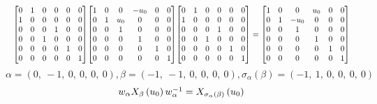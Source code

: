 \documentclass[11pt]{article}
\theoremstyle{definition}
\begin{document}
\[
\scaletoalign{\textwidth}{{\left[\begin{matrix}0 & 1 & 0 & 0 & 0 & 0\\1 & 0 & 0 & 0 & 0 & 0\\0 & 0 & 0 & 1 & 0 & 0\\0 & 0 & 1 & 0 & 0 & 0\\0 & 0 & 0 & 0 & 1 & 0\\0 & 0 & 0 & 0 & 0 & 1\end{matrix}\right]} {\left[\begin{matrix}1 & 0 & 0 & - u_{0} & 0 & 0\\0 & 1 & u_{0} & 0 & 0 & 0\\0 & 0 & 1 & 0 & 0 & 0\\0 & 0 & 0 & 1 & 0 & 0\\0 & 0 & 0 & 0 & 1 & 0\\0 & 0 & 0 & 0 & 0 & 1\end{matrix}\right]} {\left[\begin{matrix}0 & 1 & 0 & 0 & 0 & 0\\1 & 0 & 0 & 0 & 0 & 0\\0 & 0 & 0 & 1 & 0 & 0\\0 & 0 & 1 & 0 & 0 & 0\\0 & 0 & 0 & 0 & 1 & 0\\0 & 0 & 0 & 0 & 0 & 1\end{matrix}\right]} = {\left[\begin{matrix}1 & 0 & 0 & u_{0} & 0 & 0\\0 & 1 & - u_{0} & 0 & 0 & 0\\0 & 0 & 1 & 0 & 0 & 0\\0 & 0 & 0 & 1 & 0 & 0\\0 & 0 & 0 & 0 & 1 & 0\\0 & 0 & 0 & 0 & 0 & 1\end{matrix}\right]}}
\]
\[
\alpha = \left( 0, \  -1, \  0, \  0, \  0, \  0\right), \beta = \left( -1, \  -1, \  0, \  0, \  0, \  0\right), \sigma_{\alpha}(\beta) = \left( -1, \  1, \  0, \  0, \  0, \  0\right)
\]
\[
\scaletoalign{\textwidth}{w_{\alpha} X_{\beta}\left(u_{0}\right) w_{\alpha}^{-1} = X_{\sigma_{\alpha}\left(\beta\right)}\left(u_{0}\right)}
\]
\end{document}
